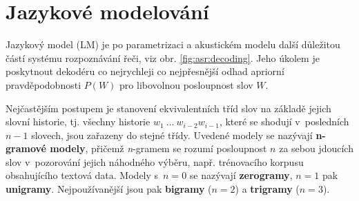 \section{Jazykové modelování}
\label{chap:asr:language}

Jazykový model (LM) je po parametrizaci a akustickém modelu další důležitou částí systému rozpoznávání řeči, viz obr. \ref{fig:asr:decoding}. Jeho úkolem je poskytnout dekodéru co nejrychleji co nejpřesnější odhad apriorní pravděpodobnosti $P\left(W\right)$ pro libovolnou posloupnost slov $W$.



Nejčastějším postupem je stanovení ekvivalentních tříd slov na základě jejich slovní historie, tj. všechny historie $w_1\ \dots\ w_{i-2}w_{i-1}$, které se shodují v~posledních $n-1$ slovech, jsou zařazeny do stejné třídy. Uvedené modely se nazývají \textbf{n-gramové modely}, přičemž \textit{n}-gramem se rozumí posloupnost $n$ za sebou jdoucích slov v~pozorování jejich náhodného výběru, např. trénovacího korpusu obsahujícího textová data. Modely s~$n=0$ se nazývají \textbf{zerogramy}, $n=1$ pak \textbf{unigramy}. Nejpoužívanější jsou pak \textbf{bigramy} ($n=2$) a \textbf{trigramy} ($n=3$).


